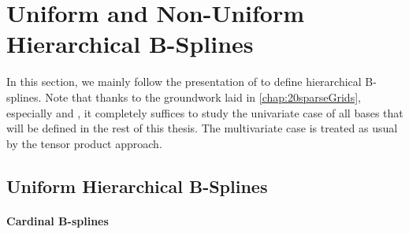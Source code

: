 \section{Uniform and Non-Uniform Hierarchical B-Splines}
\label{sec:31standardBSplines}


In this section, we mainly follow the presentation of
\cite{Valentin14Hierarchische,Valentin16Hierarchical}
to define hierarchical B-splines.
Note that thanks to the groundwork laid in \cref{chap:20sparseGrids},
especially  and
,
it completely suffices to study the univariate case
of all bases that will be defined in the rest of this thesis.
The multivariate case is treated as usual by the tensor product approach.



\subsection{Uniform Hierarchical B-Splines}


\paragraph{Cardinal B-splines}

